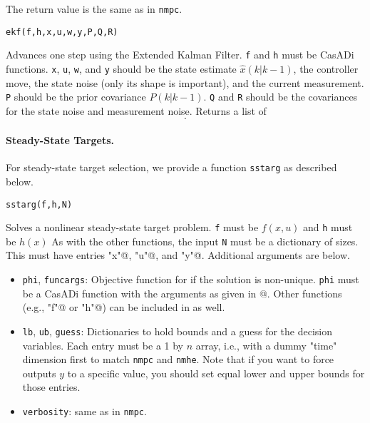 \documentclass{article}
\newcommand{\funcname}[2][.25em]{\vspace{#1}\noindent\texttt{#2}\nopagebreak\vspace{#1}}
\newcommand{\casadi}{CasADi}
\begin{document}
\begin{multicols}{2}
The return value is the same as in \texttt{nmpc}.

\funcname{ekf(f,h,x,u,w,y,P,Q,R)}

Advances one step using the Extended Kalman Filter.
\texttt{f} and \texttt{h} must be \casadi{} functions.
\texttt{x}, \texttt{u}, \texttt{w}, and \texttt{y} should be the state estimate $\hat{x}(k|k-1)$, the controller move, the state noise (only its shape is important), and the current measurement.
\texttt{P} should be the prior covariance $P(k|k-1)$.
\texttt{Q} and \texttt{R} should be the covariances for the state noise and measurement noise.
Returns a list of
%
\begin{equation*}
    [P(k+1|k), \; \hat{x}(k+1|k), \; P(k|k), \; \hat{x}(k|k)].
\end{equation*}

\paragraph*{Steady-State Targets.}

For steady-state target selection, we provide a function \texttt{sstarg} as described below.

\funcname{sstarg(f,h,N)}

Solves a nonlinear steady-state target problem.
\texttt{f} must be $f(x,u)$ and \texttt{h} must be $h(x)$
As with the other functions, the input \texttt{N} must be a dictionary of sizes.
This must have entries \lstinline@"x"@, \lstinline@"u"@, and \lstinline@"y"@.
Additional arguments are below.

\begin{itemize}[noitemsep,nolistsep]
    \item \texttt{phi}, \texttt{funcargs}: Objective function for if the solution is non-unique.
    \texttt{phi} must be a \casadi{} function with the arguments as given in \lstinline@funcargs["phi"]@.
    Other functions (e.g., \lstinline@"f"@ or \lstinline@"h"@) can be included in \lstinline@funcargs@ as well.
    \item \texttt{lb}, \texttt{ub}, \texttt{guess}: Dictionaries to hold bounds and a guess for the decision variables.
    Each entry must be a 1 by $n$ array, i.e., with a dummy "time" dimension first to match \texttt{nmpc} and \texttt{nmhe}.
    Note that if you want to force outputs $y$ to a specific value, you should set equal lower and upper bounds for those entries.
    \item \texttt{verbosity}: same as in \texttt{nmpc}.
\end{itemize}


\end{multicols}
\end{document}
